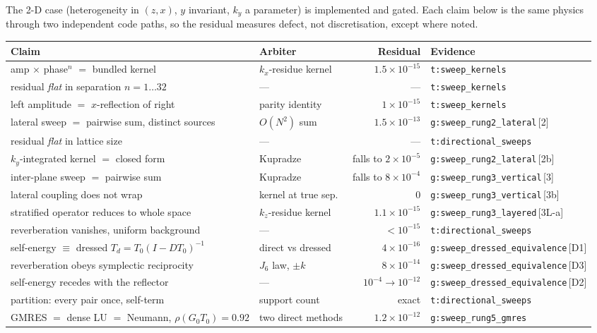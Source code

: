 \documentclass[11pt,a4paper]{article}
\newcommand{\Tz}{T_0}
\newcommand{\Gz}{G_0}
\newcommand{\gtwo}{\texttt{g:sweep\_rung2\_lateral}}
\newcommand{\gthree}{\texttt{g:sweep\_rung3\_vertical}}
\newcommand{\glay}{\texttt{g:sweep\_rung3\_layered}}
\newcommand{\gdress}{\texttt{g:sweep\_dressed\_equivalence}}
\newcommand{\gfive}{\texttt{g:sweep\_rung5\_gmres}}
\newcommand{\tsw}{\texttt{t:sweep\_kernels}}
\newcommand{\tds}{\texttt{t:directional\_sweeps}}
\begin{document}
The 2\textonehalf-D case (heterogeneity in $(z,x)$, $y$ invariant, $k_y$ a parameter) is
implemented and gated. Each claim below is the same physics through two independent code paths,
so the residual measures defect, not discretisation, except where noted.

\begin{center}
\begin{minipage}{\textwidth}
\centering\scriptsize
\setlength{\tabcolsep}{4pt}
\begin{tabular}{@{}L{0.33\textwidth}L{0.15\textwidth}rl@{}}
\toprule
Claim & Arbiter & Residual & Evidence \\
\midrule
amp $\times$ phase$^n$ $=$ bundled kernel & $k_x$-residue kernel & $1.5\times10^{-15}$ & \tsw \\
\quad residual \emph{flat} in separation $n=1\ldots32$ & --- & --- & \tsw \\
left amplitude $=$ $x$-reflection of right & parity identity & $1\times10^{-15}$ & \tsw \\
lateral sweep $=$ pairwise sum, distinct sources & $O(N^2)$ sum & $1.5\times10^{-13}$ & \gtwo\,[2] \\
\quad residual \emph{flat} in lattice size & --- & --- & \tds \\
$k_y$-integrated kernel $=$ closed form & Kupradze & falls to $2\times10^{-5}$ & \gtwo\,[2b] \\
inter-plane sweep $=$ pairwise sum & Kupradze & falls to $8\times10^{-4}$ & \gthree\,[3] \\
lateral coupling does not wrap & kernel at true sep. & $0$ & \gthree\,[3b] \\
stratified operator reduces to whole space & $k_z$-residue kernel & $1.1\times10^{-15}$ & \glay\,[3L-a] \\
reverberation vanishes, uniform background & --- & $<10^{-15}$ & \tds \\
self-energy $\equiv$ dressed $T_d=\Tz(I-D\Tz)^{-1}$ & direct vs dressed & $4\times10^{-16}$ & \gdress\,[D1] \\
reverberation obeys symplectic reciprocity & $J_6$ law, $\pm k$ & $8\times10^{-14}$ & \gdress\,[D3] \\
self-energy recedes with the reflector & --- & $10^{-4}\!\to\!10^{-12}$ & \gdress\,[D2] \\
partition: every pair once, self-term & support count & exact & \tds \\
GMRES $=$ dense LU $=$ Neumann, $\rho(\Gz\Tz)=0.92$ & two direct methods & $1.2\times10^{-12}$ & \gfive \\

\end{tabular}
\end{minipage}
\end{center}
\end{document}
